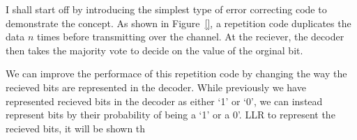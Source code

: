 I shall start off by introducing the simplest type of error correcting code to demonstrate the concept. As shown in Figure~\ref{}, a repetition code duplicates the data $n$ times before transmitting over the channel. At the reciever, the decoder then takes the majority vote to decide on the value of the orginal bit. 

We can improve the performace of this repetition code by changing the way the recieved bits are represented in the decoder. While previously we have represented recieved bits in the decoder as either `1' or `0', we can instead represent bits by their probability of being a `1' or a 0'. \acs{LLR} to represent the recieved bits, it will be shown th